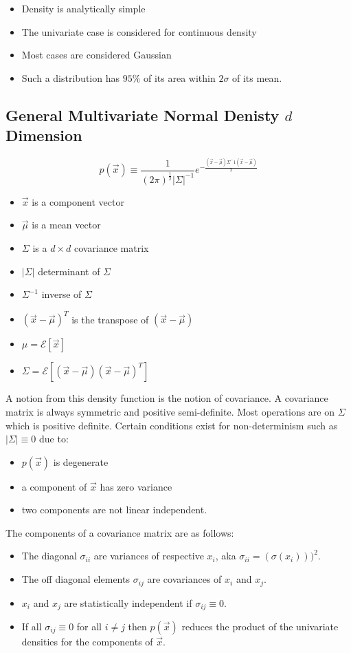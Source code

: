 \documentclass[11pt]{article}
\begin{document}
\begin{itemize}
	\item Density is analytically simple
	\item The univariate case is considered for continuous density
	\item Most cases are considered Gaussian 
	\item Such a distribution has $95\%$ of its area within $2\sigma$ of its mean. 
\end{itemize}



\subsection{General Multivariate Normal Denisty $d$ Dimension}

\[
	p(\vec{x}) \equiv \frac{1}{(2\pi)^{\frac{1}{2}}  |\Sigma|^{-1}} e^ {- \frac{(\vec{x} - \vec{\mu})  \Sigma^-1 (\vec{x} - \vec{\mu})}{2}}
\]
\begin{itemize}
	\item $\vec{x}$ is a component vector
	\item $\vec{\mu}$ is a mean vector
	\item $\Sigma$ is a $d \times d$ covariance matrix
	\item $|\Sigma|$ determinant of $\Sigma$
	\item $\Sigma ^{-1}$ inverse of $\Sigma$
	\item $(\vec{x} - \vec{\mu})^T$ is the transpose of $(\vec{x} - \vec{\mu})$
	\item $\mu =\mathcal{E} [\vec{x}] $
	\item $\Sigma = \mathcal{E} [(\vec{x} -\vec{\mu})(\vec{x} -\vec{\mu})^T ] $
\end{itemize}

A notion from this density function is the notion of covariance.   A covariance matrix is always symmetric and positive semi-definite.  Most operations are on $\Sigma$ which is positive definite.  Certain conditions exist for non-determinism such as $|\Sigma| \equiv 0$ due to:
\begin{itemize}
	\item $p(\vec{x})$ is degenerate
	\item a component of $\vec{x}$ has zero variance
	\item two components are not linear independent.
\end{itemize}
The components of a covariance matrix are as follows:
\begin{itemize}
	\item The diagonal $\sigma_{ii}$ are variances of respective $x_i$, aka $\sigma_{ii} = (\sigma(x_i) ))^2$.
	\item The off diagonal elements $\sigma_{ij}$ are covariances of $x_i$ and $x_j$.
	\item $x_i$ and $x_j$ are statistically independent if $\sigma_{ij} \equiv 0$.
	\item If all $\sigma_{ij} \equiv 0$ for all $i \neq j$ then $p(\vec{x})$ reduces the product of the univariate densities for the components of $\vec{x}$.
\end{itemize}
\end{document}
